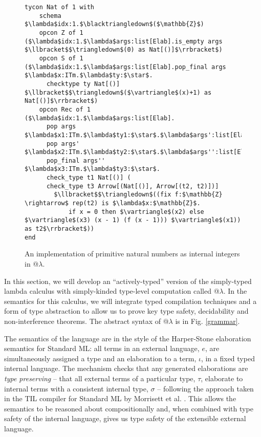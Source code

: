 \begin{figure}[t]
\begin{lstlisting}
tycon Nat of 1 with  
    schema $\lambda$idx:1.$\blacktriangledown$($\mathbb{Z}$) 
    opcon Z of 1 ($\lambda$idx:1.$\lambda$args:list[Elab].is_empty args $\llbracket$$\triangledown$(0) as Nat[()]$\rrbracket$)
    opcon S of 1 ($\lambda$idx:1.$\lambda$args:list[Elab].pop_final args $\lambda$x:ITm.$\lambda$ty:$\star$. 
      checktype ty Nat[()] $\llbracket$$\triangledown$($\vartriangle$(x)+1) as Nat[()]$\rrbracket$)
    opcon Rec of 1 ($\lambda$idx:1.$\lambda$args:list[Elab].
      pop args $\lambda$x1:ITm.$\lambda$ty1:$\star$.$\lambda$args':list[Elab].
      pop args' $\lambda$x2:ITm.$\lambda$ty2:$\star$.$\lambda$args'':list[Elab].
      pop_final args'' $\lambda$x3:ITm.$\lambda$ty3:$\star$.
      check_type t1 Nat[()] (
      check_type t3 Arrow[(Nat[()], Arrow[(t2, t2)])] 
      	$\llbracket$$\triangledown$((fix f:$\mathbb{Z} \rightarrow$ rep(t2) is $\lambda$x:$\mathbb{Z}$.
	        if x = 0 then $\vartriangle$(x2) else $\vartriangle$(x3) (x - 1) (f (x - 1))) $\vartriangle$(x1)) as t2$\rrbracket$))
end
\end{lstlisting}
\caption{An implementation of primitive natural numbers as internal integers in @$\lambda$.}
\label{nat-atlam}
\end{figure}
In this section, we will develop an ``actively-typed'' version of the simply-typed lambda calculus with simply-kinded type-level computation called @$\lambda$. In the semantics for this calculus, we will integrate typed compilation techniques and a form of type abstraction to allow us to prove key type safety, decidability and non-interference theorems. The abstract syntax of @$\lambda$ is in Fig. \ref{grammar}. 

The semantics of the language are in the style of the Harper-Stone elaboration semantics for Standard ML: all terms in an external language, $e$, are simultaneously assigned a type and an elaboration to a term, $\iota$, in a fixed typed internal language. The mechanism checks that any generated elaborations are \emph{type preserving} -- that all external terms of a particular type, $\tau$, elaborate to internal terms with a consistent internal type, $\sigma$ -- following the approach taken in the TIL compiler for Standard ML by Morrisett et al. \cite{TIL}. This allows the semantics to be reasoned about compositionally and, when combined with type safety of the internal language, gives us type safety of the extensible external language. 

